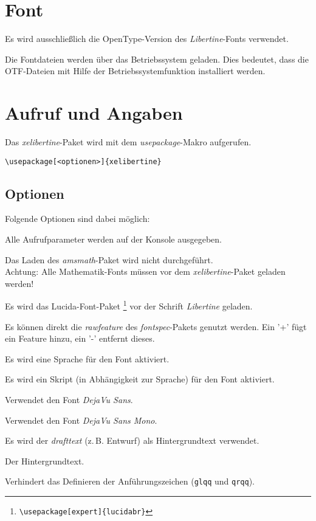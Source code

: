 \documentclass{fontdoku}
\begin{document}
\section{Font}

Es wird ausschließlich die OpenType-Version des \emph{Libertine}-Fonts verwendet.






Die Fontdateien werden über das Betriebssystem geladen. Dies bedeutet, dass die OTF-Dateien mit Hilfe der Betriebssystemfunktion installiert werden.

\section{Aufruf und Angaben}

Das \emph{xelibertine}-Paket wird mit dem \emph{usepackage}-Makro aufgerufen.

\begin{lstlisting}
\usepackage[<optionen>]{xelibertine}
\end{lstlisting}

\subsection{Optionen}

Folgende Optionen sind dabei möglich:
\begin{description}
\item [debug] Alle Aufrufparameter werden auf der Konsole ausgegeben.
\item [noamsmath] Das Laden des \emph{amsmath}-Paket wird nicht durchgeführt.\\
      Achtung: Alle Mathematik-Fonts müssen vor dem \emph{xelibertine}-Paket
      geladen werden!
\item [lucida] Es wird das Lucida-Font-Paket%
      \footnote{\texttt{\textbackslash usepackage[expert]\{lucidabr\}}}
      vor der Schrift \emph{Libertine} geladen.
\item [rawfeature] Es können direkt die \emph{rawfeature} des \emph{fontspec}-Pakets genutzt werden.
      Ein '+' fügt ein Feature hinzu, ein '-' entfernt dieses.
\item [language] Es wird eine Sprache für den Font aktiviert.
\item [script]   Es wird ein Skript (in Abhängigkeit zur Sprache) für den Font aktiviert.
\item [dejavusans] Verwendet den Font \emph{DejaVu Sans}.
\item [dejavusansmono] Verwendet den Font \emph{DejaVu Sans Mono}.
\item [draft] Es wird der \emph{drafttext} (z.\,B. Entwurf) als Hintergrundtext verwendet.
\item [drafttext] Der Hintergrundtext.
\item [noquotes] Verhindert das Definieren der Anführungszeichen (\texttt{glqq} und \texttt{qrqq}).
\end{description}
\end{document}
